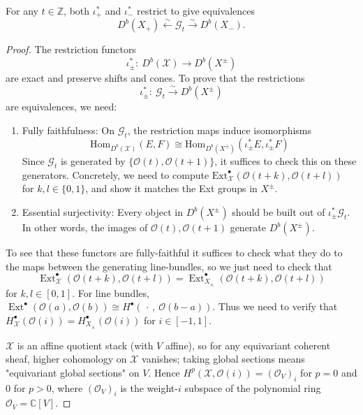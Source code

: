 \documentclass[12pt]{article}
\begin{document}
\begin{claim}
  For any $t \in \mathbb{Z}$, both $\iota_+^*$ and $\iota_-^*$ restrict to give equivalences
  \[
    D^b(X_+) \xleftarrow{\sim} \mathcal{G}_t \xrightarrow{\sim} D^b(X_-).
  \]
\end{claim}
\begin{proof}
The restriction functors
\[
  \iota_\pm^*:\ D^b(\mathcal X)\longrightarrow D^b(X^\pm)
\]
are exact and preserve shifts and cones. To prove that the restrictions
\[
  \iota_\pm^*:\ \mathcal{G}_t \xrightarrow{\ \sim\ } D^b(X^\pm)
\]
are equivalences, we need:
\begin{enumerate}
  \item Fully faithfulness: On $\mathcal{G}_t$, the restriction maps induce isomorphisms
        \[\mathrm{Hom}_{D^b(\mathcal{X})}(E,F) \cong \mathrm{Hom}_{D^b(X^\pm)}(\iota_\pm^*E, \iota_\pm^*F)\]
        Since $\mathcal{G}_t$ is generated by $\{\mathcal{O}(t), \mathcal{O}(t+1)\}$, it suffices to check this on these generators.
        Concretely, we need to compute $\mathrm{Ext}^\bullet_{\mathcal{X}}(\mathcal{O}(t+k), \mathcal{O}(t+l))$ for $k,l\in\{0,1\}$,
        and show it matches the Ext groups in $X^\pm$.

  \item Essential surjectivity: Every object in $D^b(X^\pm)$ should be built out of $\iota_\pm^*\mathcal{G}_t$.
        In other words, the images of $\mathcal{O}(t), \mathcal{O}(t+1)$ generate $D^b(X^\pm)$.
\end{enumerate}


To see that these functors are fully-faithful it suffices to check what they do to the maps
between the generating line-bundles, so we just need to check that
\[
  \operatorname{Ext}^\bullet_{\mathcal{X}}(\mathcal{O}(t+k),\mathcal{O}(t+l))
  = \operatorname{Ext}^\bullet_{X_\pm}(\mathcal{O}(t+k),\mathcal{O}(t+l))
\]
for $k,l \in [0,1]$.
For line bundles, $\operatorname{Ext}^\bullet(\mathcal O(a),\mathcal O(b)) \cong H^\bullet(\,\cdot\,,\ \mathcal O(b-a))$. Thus we need to verify that $H^\bullet_{\mathcal{X}}(\mathcal{O}(i)) = H^\bullet_{X_\pm}(\mathcal{O}(i))$ for $i \in [-1,1]$.

$\mathcal{X}$ is an affine quotient stack (with $V$ affine), so for any equivariant coherent sheaf, higher cohomology on $\mathcal{X}$ vanishes; taking global sections means "equivariant global sections" on $V$. Hence $H^p(\mathcal{X},\mathcal{O}(i))=(\mathcal{O}_V)_i$ for $p=0$ and $0$ for $p>0$, where $(\mathcal{O}_V)_i$ is the weight-$i$ subspace of the polynomial ring $\mathcal{O}_V=\mathbb{C}[V]$.


\end{proof}
\end{document}

